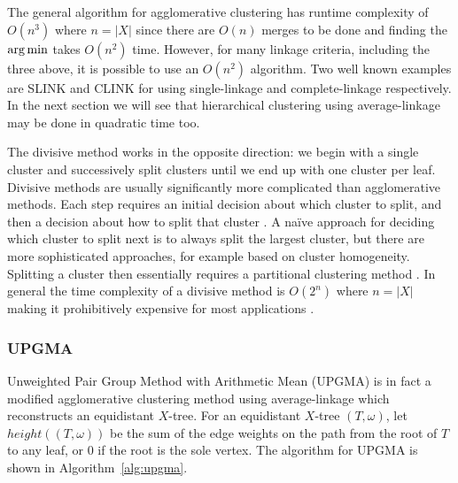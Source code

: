 The general algorithm for agglomerative clustering has runtime complexity of
$O(n^3)$ where $n = |X|$ since there are $O(n)$ merges to be done and finding
the $\operatorname*{arg\,min}$ takes $O(n^2)$ time.  However, for many linkage criteria,
including the three above, it is possible to use an $O(n^2)$ algorithm.  Two
well known examples are SLINK \cite{sibson1973slink} and CLINK
\cite{defays1977efficient} for using single-linkage and complete-linkage
respectively.  In the next section we will see that hierarchical clustering
using average-linkage may be done in quadratic time too.

The divisive method works in the opposite direction: we begin with a single
cluster and successively split clusters until we end up with one cluster per
leaf.  Divisive methods are usually significantly more complicated than
agglomerative methods.  Each step requires an initial decision about which
cluster to split, and then a decision about how to split that cluster
\cite{savaresi2002cluster}.  A naïve approach for deciding which cluster to
split next is to always split the largest cluster, but there are more
sophisticated approaches, for example based on cluster homogeneity.  Splitting
a cluster then essentially requires a partitional clustering method
\cite{ding2002cluster}.  In general the time complexity of a divisive method
is $O(2^n)$ where $n = |X|$ making it prohibitively expensive for most
applications \cite{cimiano2004comparing}.

\subsubsection{UPGMA}
\label{sec:upgma}

Unweighted Pair Group Method with Arithmetic Mean (UPGMA)
\cite{sokal1958statistical} is in fact a modified agglomerative clustering
method using average-linkage which reconstructs an equidistant $X$-tree.  For
an equidistant $X$-tree $(T,\omega)$, let $height((T,\omega))$ be the sum of
the edge weights on the path from the root of $T$ to any leaf, or 0 if the
root is the sole vertex.  The algorithm for UPGMA is shown in
Algorithm~\ref{alg:upgma}.

